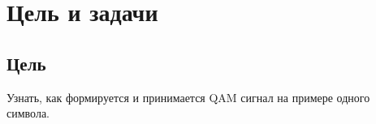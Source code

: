 \chapter*{Цель и задачи}
\label{ch:intro}

\section{Цель}
Узнать, как формируется и принимается QAM сигнал на примере одного символа.

\endinput